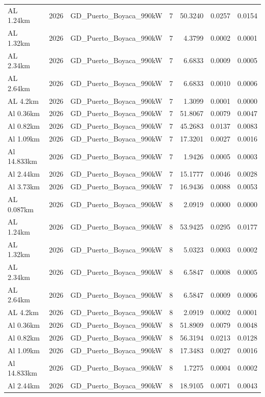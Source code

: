 \documentclass[11pt,a4paper]{article}
\begin{document}
\begin{longtable}{llllrrr}
AL 1.24km & 2026 & GD\_Puerto\_Boyaca\_990kW & 7 & 50.3240 & 0.0257 & 0.0154 \\
AL 1.32km & 2026 & GD\_Puerto\_Boyaca\_990kW & 7 & 4.3799 & 0.0002 & 0.0001 \\
AL 2.34km & 2026 & GD\_Puerto\_Boyaca\_990kW & 7 & 6.6833 & 0.0009 & 0.0005 \\
AL 2.64km & 2026 & GD\_Puerto\_Boyaca\_990kW & 7 & 6.6833 & 0.0010 & 0.0006 \\
AL 4.2km & 2026 & GD\_Puerto\_Boyaca\_990kW & 7 & 1.3099 & 0.0001 & 0.0000 \\
Al 0.36km & 2026 & GD\_Puerto\_Boyaca\_990kW & 7 & 51.8067 & 0.0079 & 0.0047 \\
Al 0.82km & 2026 & GD\_Puerto\_Boyaca\_990kW & 7 & 45.2683 & 0.0137 & 0.0083 \\
Al 1.09km & 2026 & GD\_Puerto\_Boyaca\_990kW & 7 & 17.3201 & 0.0027 & 0.0016 \\
Al 14.833km & 2026 & GD\_Puerto\_Boyaca\_990kW & 7 & 1.9426 & 0.0005 & 0.0003 \\
Al 2.44km & 2026 & GD\_Puerto\_Boyaca\_990kW & 7 & 15.1777 & 0.0046 & 0.0028 \\
Al 3.73km & 2026 & GD\_Puerto\_Boyaca\_990kW & 7 & 16.9436 & 0.0088 & 0.0053 \\
AL 0.087km & 2026 & GD\_Puerto\_Boyaca\_990kW & 8 & 2.0919 & 0.0000 & 0.0000 \\
AL 1.24km & 2026 & GD\_Puerto\_Boyaca\_990kW & 8 & 53.9425 & 0.0295 & 0.0177 \\
AL 1.32km & 2026 & GD\_Puerto\_Boyaca\_990kW & 8 & 5.0323 & 0.0003 & 0.0002 \\
AL 2.34km & 2026 & GD\_Puerto\_Boyaca\_990kW & 8 & 6.5847 & 0.0008 & 0.0005 \\
AL 2.64km & 2026 & GD\_Puerto\_Boyaca\_990kW & 8 & 6.5847 & 0.0009 & 0.0006 \\
AL 4.2km & 2026 & GD\_Puerto\_Boyaca\_990kW & 8 & 2.0919 & 0.0002 & 0.0001 \\
Al 0.36km & 2026 & GD\_Puerto\_Boyaca\_990kW & 8 & 51.8909 & 0.0079 & 0.0048 \\
Al 0.82km & 2026 & GD\_Puerto\_Boyaca\_990kW & 8 & 56.3194 & 0.0213 & 0.0128 \\
Al 1.09km & 2026 & GD\_Puerto\_Boyaca\_990kW & 8 & 17.3483 & 0.0027 & 0.0016 \\
Al 14.833km & 2026 & GD\_Puerto\_Boyaca\_990kW & 8 & 1.7275 & 0.0004 & 0.0002 \\
Al 2.44km & 2026 & GD\_Puerto\_Boyaca\_990kW & 8 & 18.9105 & 0.0071 & 0.0043 \\

\end{longtable}
\end{document}
